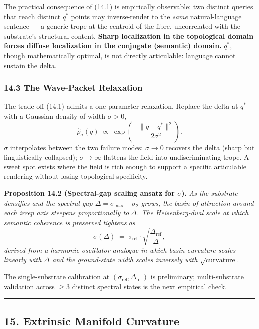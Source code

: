 \documentclass[
  11pt,
]{article}
\begin{document}
The practical consequence of (14.1) is empirically observable: two
distinct queries that reach distinct \(q^*\) points may inverse-render
to the \emph{same} natural-language sentence --- a generic trope at the
centroid of the fibre, uncorrelated with the substrate's structural
content. \textbf{Sharp localization in the topological domain forces
diffuse localization in the conjugate (semantic) domain.} \(q^*\),
though mathematically optimal, is not directly articulable: language
cannot sustain the delta.

\subsubsection{14.3 The Wave-Packet
Relaxation}\label{the-wave-packet-relaxation}

The trade-off (14.1) admits a one-parameter relaxation. Replace the
delta at \(q^*\) with a Gaussian density of width \(\sigma > 0\),
\[\hat\rho_\sigma(q) \;\propto\; \exp\!\left(-\frac{\|q - q^*\|^2}{2\sigma^2}\right). \tag{14.2}\]
\(\sigma\) interpolates between the two failure modes: \(\sigma \to 0\)
recovers the delta (sharp but linguistically collapsed);
\(\sigma \to \infty\) flattens the field into undiscriminating trope. A
sweet spot exists where the field is rich enough to support a specific
articulable rendering without losing topological specificity.

\textbf{Proposition 14.2 (Spectral-gap scaling ansatz for \(\sigma\)).}
\emph{As the substrate densifies and the spectral gap
\(\Delta = \sigma_\text{max} - \sigma_2\) grows, the basin of attraction
around each irrep axis steepens proportionally to \(\Delta\). The
Heisenberg-dual scale at which semantic coherence is preserved tightens
as}
\[\sigma(\Delta) \;=\; \sigma_\text{ref} \cdot \sqrt{\frac{\Delta_\text{ref}}{\Delta}}, \tag{14.3}\]
\emph{derived from a harmonic-oscillator analogue in which basin
curvature scales linearly with \(\Delta\) and the ground-state width
scales inversely with \(\sqrt{\text{curvature}}\).}

The single-substrate calibration at
\((\sigma_\text{ref}, \Delta_\text{ref})\) is preliminary;
multi-substrate validation across \(\geq 3\) distinct spectral states is
the next empirical check.

\begin{center}\rule{0.5\linewidth}{0.5pt}\end{center}

\subsection{15. Extrinsic Manifold
Curvature}\label{extrinsic-manifold-curvature}
\end{document}
